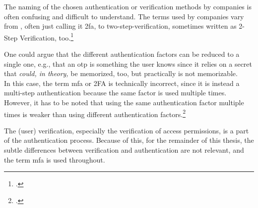 The naming of the chosen authentication or verification methods by companies is often confusing and difficult to understand. The terms used by companies vary from , often just calling it \gls{2fa}, to two-step-verification, sometimes written as 2-Step Verification, too.\footcites[See][]{apple_2fa}[See][]{apple_s2v}[See][]{playstation}[See][]{google_2-step_verification}[See][]{microsoft_2sv}

One could argue that the different authentication factors can be reduced to a single one, e.g., that an \gls{otp} is \frqq something the user knows\flqq{} since it relies on a secret that \textit{could, in theory,} be memorized, too, but practically is not memorizable.\\
In this case, the term \gls{mfa} or 2FA is technically incorrect, since it is instead a multi-step authentication because the same factor is used multiple times. However, it has to be noted that using the same authentication factor multiple times is weaker than using different authentication factors.\footcite[See][117]{grimes2017hacking}

The (user) verification, especially the verification of access permissions, is a part of the authentication process. Because of this, for the remainder of this thesis, the subtle differences between verification and authentication are not relevant, and the term \gls{mfa} is used throughout.